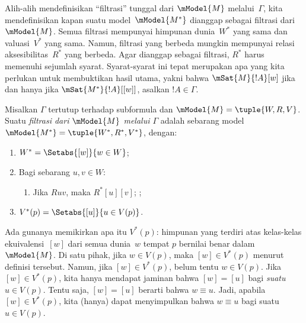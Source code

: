 \documentclass[../../../include/open-logic-section]{subfiles}
\begin{document}


Alih-alih mendefinisikan ``filtrasi'' tunggal dari $\mModel{M}$
melalui~$\Gamma$, kita mendefinisikan kapan suatu model~$\mModel{M^*}$
dianggap sebagai filtrasi dari~$\mModel{M}$. Semua filtrasi mempunyai himpunan
dunia~$W^*$ yang sama dan valuasi~$V^*$ yang sama. Namun, filtrasi yang
berbeda mungkin mempunyai relasi aksesibilitas~$R^*$ yang berbeda. Agar
dianggap sebagai filtrasi, $R^*$ harus memenuhi sejumlah syarat. Syarat-syarat
ini tepat merupakan apa yang kita perlukan untuk membuktikan hasil utama,
yakni bahwa $\mSat{M}{!A}[w]$ jika dan hanya jika
$\mSat{M^*}{!A}[{[w]}]$, asalkan $!A \in \Gamma$.

\begin{defn}
  Misalkan $\Gamma$ tertutup terhadap subformula dan
  $\mModel{M} = \tuple{W, R, V}$. Suatu \emph{filtrasi dari $\mModel{M}$
  melalui $\Gamma$} adalah sebarang model
  $\mModel{M^*} = \tuple{W^*,R^*,V^*}$, dengan:
  \begin{enumerate}
  \item $W^* = \Setabs{[w]}{w \in W}$;
  \item {}%
    Bagi sebarang $u,v \in W$:
    \begin{enumerate}
    \item {}%
      Jika $Ruv$, maka $R^*[u][v]$;
    ;
    \end{enumerate}
  \item $V^*(p) = \Setabs{[u]}{u \in V(p)}$.
  \end{enumerate}
\end{defn}

Ada gunanya memikirkan apa itu $V^*(p)$: himpunan yang terdiri atas
kelas-kelas ekuivalensi~$[w]$ dari semua dunia~$w$ tempat $p$ bernilai benar
dalam~$\mModel{M}$. Di satu pihak, jika $w \in V(p)$, maka $[w] \in V^*(p)$
menurut definisi tersebut. Namun, jika $[w] \in V^*(p)$, belum tentu
$w \in V(p)$. Jika $[w] \in V^*(p)$, kita hanya mendapat jaminan bahwa
$[w] = [u]$ bagi \emph{suatu}~$u \in V(p)$. Tentu saja, $[w] = [u]$
berarti bahwa $w \equiv u$. Jadi, apabila $[w] \in V^*(p)$, kita (hanya)
dapat menyimpulkan bahwa $w \equiv u$ bagi suatu $u \in V(p)$.
\end{document}
